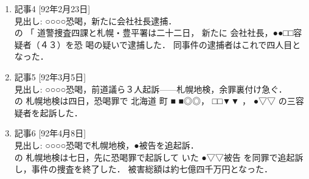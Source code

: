 \begin{enumerate}
\item 記事4 [92年2月23日]
\\ 
見出し: ○○○○恐喝，新たに会社社長逮捕．
\\ 
\shadedbox
      {の}\shadedbox
      {「}
      道警捜査四課と札幌・豊平署は二十二日，
      新たに
      会社社長，●●□□容疑者（４３）を恐
      喝の疑いで逮捕した．
同事件の逮捕者はこれで四人目となった．
\item 記事5 [92年3月5日]
\\ 
見出し: ○○○○恐喝，前道議ら３人起訴——札幌地検，余罪裏付け急ぐ．
\\ 
\shadedbox
      {の}
      札幌地検は四日，恐喝罪で\shadedbox
      {北海道}\shadedbox
      {町}
      ■
      ■◎◎，
      □□▼▼
      ，
      ●▽▽
      の三容疑者を起訴した．

\item 記事6 [92年4月8日]
\\ 
見出し: ○○○○恐喝で札幌地検，●被告を追起訴．
\\ 
\shadedbox
      {の}
      札幌地検は七日，先に恐喝罪で起訴して
      いた
      ●▽▽被告
      を同罪で追起訴し，事件の捜査を終了した．
被害総額は約七億四千万円となった．
\end{enumerate}

